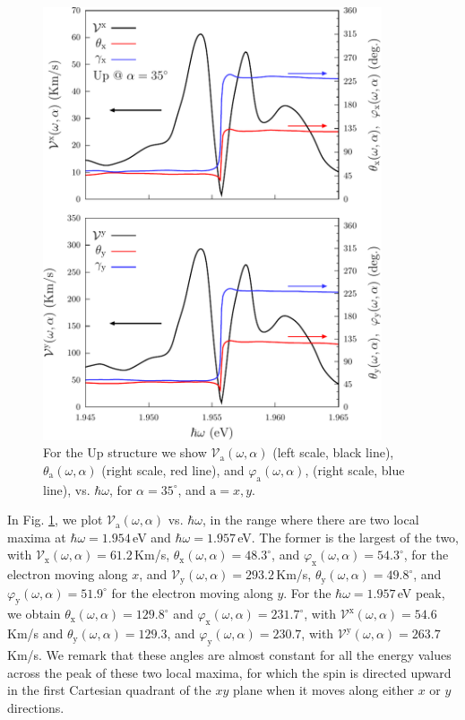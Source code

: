 \documentclass[floatfix,prb,aps,superscriptaddress,showpacs,11pt,preprint,letterpaper]{revtex4}
\def\tama{10cm}
\begin{document}
\begin{figure}[t]
\centering
\includegraphics[width=\tama]{upplots/up-vx-vy-w2}
\caption{For the Up structure we show $\mathcal{V}_{\mathrm{a}}
(\omega,\alpha)$ (left scale, black line), $\theta_{\mathrm{a}}
(\omega,\alpha)$ (right scale, red line), and $\varphi_{\mathrm{a}}
(\omega,\alpha)$, (right scale, blue line), vs. $\hbar\omega$, for
$\alpha=35^\circ$, and $\mathrm{a}=x,y$. }
\label{fig:up-vx-vy-w2}
\end{figure}
In Fig. \ref{fig:up-vx-vy-w2}, we plot $\mathcal{V}_{\mathrm{a}}
(\omega,\alpha)$ vs. $\hbar\omega$, in the range where there are two local
maxima at $\hbar\omega=1.954$\,eV and $\hbar\omega=1.957$\,eV. The former is the
largest of the two, with $\mathcal{V}_{\mathrm{x}} (\omega,\alpha)=61.2$\,Km/s,
$\theta_{\mathrm{x}} (\omega,\alpha)=48.3^{\circ}$, and $\varphi_{\mathrm{x}}
(\omega,\alpha)=54.3^{\circ}$, for the electron moving along $x$, and
$\mathcal{V}_{\mathrm{y}} (\omega,\alpha)=293.2$\,Km/s, $\theta_{\mathrm{y}}
(\omega,\alpha) = 49.8^{\circ}$, and $\varphi_{\mathrm{y}} (\omega,\alpha) =
51.9^{\circ}$ for the electron moving along $y$. For the $\hbar\omega=1.957$\,eV
peak, we obtain $\theta_{\mathrm{x}} (\omega,\alpha) = 129.8^{\circ}$ and
$\varphi_{\mathrm{x}} (\omega,\alpha) = 231.7^{\circ}$, with
$\mathcal{V}^{\mathrm{x}} (\omega,\alpha) = 54.6$\,Km/s and $\theta_{\mathrm{y}}
(\omega,\alpha) = 129.3$, and $\varphi_{\mathrm{y}} (\omega,\alpha) = 230.7$,
with $\mathcal{V}^{\mathrm{y}} (\omega,\alpha) = 263.7$\,Km/s. We remark that
these angles are almost constant for all the energy values across the peak of
these two local maxima, for which the spin is directed upward in the first
Cartesian quadrant of the $xy$ plane when it moves along either $x$ or $y$
directions.
\end{document}
